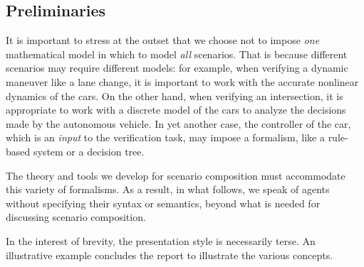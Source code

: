 \subsection{Preliminaries}
It is important to stress at the outset that we choose not to impose \emph{one} mathematical model in which to model \emph{all} scenarios.
That is because different scenarios may require different models: for example, when verifying a dynamic maneuver like a lane change, it is important to work with the accurate nonlinear dynamics of the cars.
On the other hand, when verifying an intersection, it is appropriate to work with a discrete model of the cars to analyze the decisions made by the autonomous vehicle. In yet another case, the controller of the car, which is an \emph{input} to the verification task, may impose a formalism, like a rule-based system or a decision tree.

The theory and tools we develop for scenario composition must accommodate this variety of formalisms. 
As a result, in what follows, we speak of agents without specifying their syntax or semantics, beyond what is needed for discussing scenario composition.

In the interest of brevity, the presentation style is necessarily terse. 
An illustrative example concludes the report to illustrate the various concepts. 